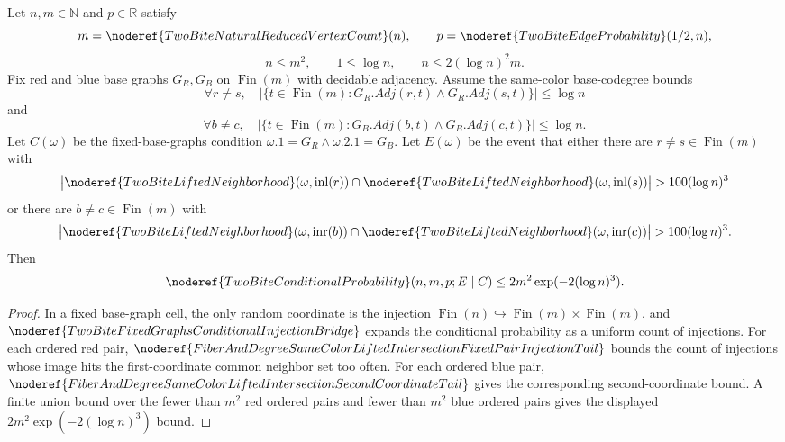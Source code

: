 \begin{helper}
Let \(n,m\in\mathbb N\) and \(p\in\mathbb R\) satisfy
\[
m=\noderef{TwoBiteNaturalReducedVertexCount}(n),\qquad
p=\noderef{TwoBiteEdgeProbability}(1/2,n),
\]
\[
n\le m^2,\qquad 1\le \log n,\qquad
n\le 2(\log n)^2m.
\]
Fix red and blue base graphs \(G_R,G_B\) on \(\operatorname{Fin}(m)\) with
decidable adjacency.  Assume the same-color base-codegree bounds
\[
\forall r\ne s,\quad
\bigl|\{t\in\operatorname{Fin}(m):G_R.Adj(r,t)\land G_R.Adj(s,t)\}\bigr|
\le \log n
\]
and
\[
\forall b\ne c,\quad
\bigl|\{t\in\operatorname{Fin}(m):G_B.Adj(b,t)\land G_B.Adj(c,t)\}\bigr|
\le \log n.
\]
Let \(C(\omega)\) be the fixed-base-graphs condition
\(\omega.1=G_R\land\omega.2.1=G_B\).  Let \(E(\omega)\) be the event that
either there are \(r\ne s\in\operatorname{Fin}(m)\) with
\[
\bigl|
\noderef{TwoBiteLiftedNeighborhood}(\omega,\operatorname{inl}(r))
\cap
\noderef{TwoBiteLiftedNeighborhood}(\omega,\operatorname{inl}(s))
\bigr|>100(\log n)^3
\]
or there are \(b\ne c\in\operatorname{Fin}(m)\) with
\[
\bigl|
\noderef{TwoBiteLiftedNeighborhood}(\omega,\operatorname{inr}(b))
\cap
\noderef{TwoBiteLiftedNeighborhood}(\omega,\operatorname{inr}(c))
\bigr|>100(\log n)^3.
\]
Then
\[
\noderef{TwoBiteConditionalProbability}(n,m,p;E\mid C)
\le
2m^2\exp(-2(\log n)^3).
\]
\end{helper}
\begin{proof}
In a fixed base-graph cell, the only random coordinate is the injection
\(\operatorname{Fin}(n)\hookrightarrow \operatorname{Fin}(m)\times
\operatorname{Fin}(m)\), and
\(\noderef{TwoBiteFixedGraphsConditionalInjectionBridge}\) expands the
conditional probability as a uniform count of injections.  For each ordered
red pair,
\(\noderef{FiberAndDegreeSameColorLiftedIntersectionFixedPairInjectionTail}\)
bounds the count of injections whose image hits the first-coordinate common
neighbor set too often.  For each ordered blue pair,
\(\noderef{FiberAndDegreeSameColorLiftedIntersectionSecondCoordinateTail}\)
gives the corresponding second-coordinate bound.  A finite union bound over
the fewer than \(m^2\) red ordered pairs and fewer than \(m^2\) blue ordered
pairs gives the displayed \(2m^2\exp(-2(\log n)^3)\) bound.
\end{proof}
